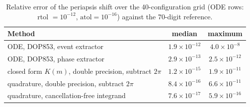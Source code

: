 \begin{table}[!htbp]
\centering
\caption{Relative error of the periapsis shift over the 40-configuration grid (ODE rows: rtol $=10^{-12}$, $\mathrm{atol}=10^{-16}$) against the 70-digit reference.}
\label{tab:baselines}
\begin{tabular}{lcc}
\toprule
Method & median & maximum \\
\midrule
ODE, DOP853, event extractor & $1.9\times10^{-12}$ & $4.0\times10^{-8}$ \\
ODE, DOP853, phase extractor & $2.9\times10^{-13}$ & $2.5\times10^{-12}$ \\
closed form $K(m)$, double precision, subtract $2\pi$ & $1.2\times10^{-15}$ & $1.9\times10^{-11}$ \\
quadrature, double precision, subtract $2\pi$ & $8.4\times10^{-16}$ & $6.6\times10^{-11}$ \\
quadrature, cancellation-free integrand & $7.6\times10^{-17}$ & $5.9\times10^{-16}$ \\
\bottomrule
\end{tabular}
\end{table}
